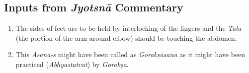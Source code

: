 \subsection*{Inputs from \textit{Jyotsnā} Commentary}
\vspace{-5pt}

\begin{enumerate}
\itemsep=0pt
\item The sides of feet are to be held by interlocking of the fingers and the \textit{Tala} (the portion of the arm around elbow) should be touching the abdomen. 
\item This \textit{Āsana-s} might have been called as \textit{Gorakṣāsana} as it might have been practiced (\textit{Abhyastatvat}) by \textit{Gorakṣa}. 
\end{enumerate}
